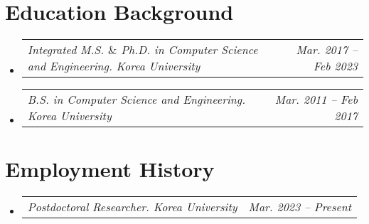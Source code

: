 \documentclass[letterpaper,11pt]{article}
\makeatletter
\newcommand{\resumeSubheadingTwo}[2]{
  \vspace{-2pt}\item
    \begin{tabular*}{1.0\textwidth}[t]{l@{\extracolsep{\fill}}r}
      \textit{#1} & \textit{#2} \\
    \end{tabular*}\vspace{-7pt}
}
\newcommand{\resumeSubheading}[4]{
  \vspace{-2pt}\item
    \begin{tabular*}{1.0\textwidth}[t]{l@{\extracolsep{\fill}}r}
      \textbf{#1} & \textbf{\small #2} \\
      \textit{\small#3} & \textit{\small #4} \\
    \end{tabular*}\vspace{-7pt}
}
\newcommand{\resumeSubHeadingListStart}{\begin{itemize}[leftmargin=0.0in, label={}]}
\newcommand{\resumeSubHeadingListEnd}{\end{itemize}}
\makeatother
\begin{document}




\section{Education Background}
  \resumeSubHeadingListStart
  \resumeSubheadingTwo
      {Integrated M.S. $\&$ Ph.D. in Computer Science and Engineering. Korea University}{Mar. 2017 -- Feb 2023}\vspace{-12pt}
      \resumeSubheadingTwo
      {B.S. in Computer Science and Engineering. Korea University}{Mar. 2011 -- Feb 2017}      
  \resumeSubHeadingListEnd


\section{Employment History}
\resumeSubHeadingListStart
    \resumeSubheadingTwo
    {Postdoctoral Researcher. Korea University}{Mar. 2023 -- Present}\vspace{-15pt}  
\resumeSubHeadingListEnd

\end{document}
